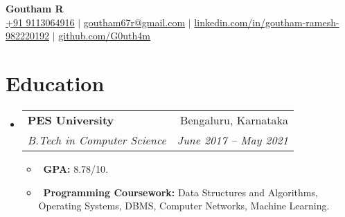 \documentclass[letterpaper,10pt]{article}
\makeatletter
\newcommand{\resumeItem}[1]{\item\small{#1}}
\newcommand{\resumeSubheading}[4]{
\vspace{-1pt}\item
  \begin{tabular*}{0.97\textwidth}[t]{l@{\extracolsep{\fill}}r}
    \textbf{#1} & #2 \\
    \textit{#3} & \textit{#4} \\
  \end{tabular*}\vspace{-7pt}
}
\newcommand{\resumeSubHeadingList}{\begin{itemize}[leftmargin=0.15in, label={}]}
\newcommand{\resumeSubHeadingListEnd}{\end{itemize}}
\makeatother
\begin{document}
\begin{center}
  \textbf{\Huge Goutham R} \\[2ex]

  \small 
  \faMobile \hspace{.5pt}  \href{tel:9113064916}{+91 9113064916} 
  $|$ 
  \faAt \hspace{.5pt} \href{mailto:goutham67r@gmail.com}{goutham67r@gmail.com} 
  $|$ 
  \faLinkedinSquare \hspace{.5pt} \href{https://www.linkedin.com/in/goutham-ramesh-982220192/}{linkedin.com/in/goutham-ramesh-982220192} 
  $|$
  \faGithub \hspace{.5pt} \href{https://github.com/G0uth4m}{github.com/G0uth4m}
\end{center}


\section{Education}
\resumeSubHeadingList
  \resumeSubheading
      {PES University}{Bengaluru, Karnataka}
      {B.Tech in Computer Science}{June 2017 -- May 2021} \newline
      \resumeSubHeadingList
        \resumeItem{\textbullet\ \textbf{GPA:} {8.78/10}.}
        \resumeItem{\textbullet\ \textbf{Programming Coursework:} {Data Structures and Algorithms, Operating Systems, DBMS, Computer Networks, Machine Learning.}}
      \resumeSubHeadingListEnd
\resumeSubHeadingListEnd
\end{document}
